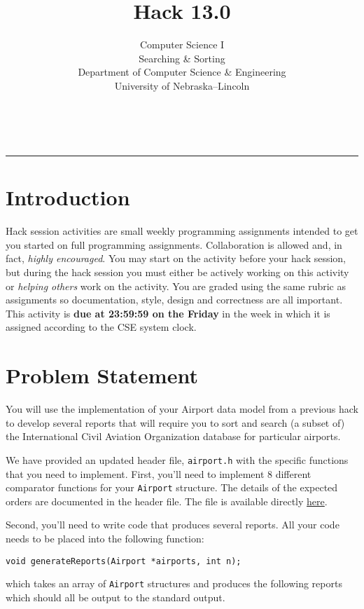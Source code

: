 \documentclass[12pt]{scrartcl}
\title{Hack 13.0}\let\Title\@title
\subtitle{Computer Science I\\
Searching \& Sorting\\
{\small
\vskip1cm
Department of Computer Science \& Engineering \\
University of Nebraska--Lincoln}
\vskip-3cm}
\date{~}
\begin{document}
\maketitle

\hrule

\section*{Introduction}

Hack session activities are small weekly programming assignments intended
to get you started on full programming assignments.  Collaboration is allowed
and, in fact, \emph{highly encouraged}.  You may start on the activity before
your hack session, but during the hack session you must either be actively 
working on this activity or \emph{helping others} work on the activity.
You are graded using the same rubric as assignments so documentation, style, 
design and correctness are all important.  This activity is \textbf{due 
at 23:59:59 on the Friday} in the week in which it is assigned according 
to the CSE system clock.

\section*{Problem Statement}

You will use the implementation of your Airport data model from a previous
hack to develop several reports that will require you to sort and search
(a subset of) the International Civil Aviation Organization database for
particular airports.  

We have provided an updated header file, \texttt{airport.h} with
the specific functions that you need to implement.  First, you'll need to
implement 8 different comparator functions for your \texttt{Airport}
structure.  The details of the expected orders are documented in the header
file.  The file is available directly \href{https://github.com/cbourke/ComputerScienceI/blob/master/hacks/hack13.0-files/airport.h}{here}.

Second, you'll need to write code that produces several reports.  All your
code needs to be placed into the following function:

\texttt{void generateReports(Airport *airports, int n);}

which takes an array of \texttt{Airport} structures and produces the
following reports which should all be output to the standard output.
\end{document}
